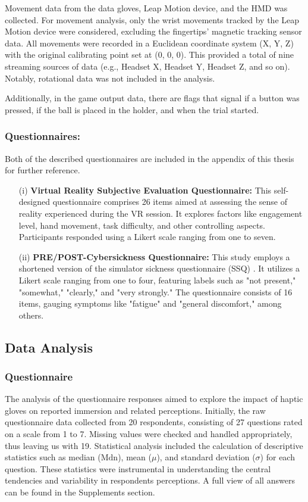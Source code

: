 \documentclass[12pt,oneside,openright]{report}
\begin{document}
 Movement data from the data gloves, Leap Motion device, and the HMD was collected. For movement analysis, only the wrist movements tracked by the Leap Motion device were considered, excluding the fingertips' magnetic tracking sensor data. All movements were recorded in a Euclidean coordinate system (X, Y, Z) with the original calibrating point set at (0, 0, 0). This provided a total of nine streaming sources of data (e.g., Headset X, Headset Y, Headset Z, and so on). Notably, rotational data was not included in the analysis.

Additionally, in the game output data, there are flags that signal if a button was pressed, if the ball is placed in the holder, and when the trial started.

\subsubsection*{Questionnaires:}
Both of the described questionnaires are included in the appendix of this thesis for further reference.

\begin{enumerate}
\item[(i)] \textbf{Virtual Reality Subjective Evaluation Questionnaire:} This self-designed questionnaire comprises 26 items aimed at assessing the sense of reality experienced during the VR session. It explores factors like engagement level, hand movement, task difficulty, and other controlling aspects. Participants responded using a Likert scale ranging from one to seven.

\item[(ii)] \textbf{PRE/POST-Cybersickness Questionnaire:} This study employs a shortened version of the simulator sickness questionnaire (SSQ) \parencite*{avpsy}. It utilizes a Likert scale ranging from one to four, featuring labels such as "not present," "somewhat," "clearly," and "very strongly." The questionnaire consists of 16 items, gauging symptoms like "fatigue" and "general discomfort," among others.
\end{enumerate}


\subsection*{Data Analysis}

\subsubsection*{Questionnaire}
The analysis of the questionnaire responses aimed to explore the impact of haptic gloves on reported immersion and related perceptions. Initially, the raw questionnaire data collected from 20 respondents, consisting of 27 questions rated on a scale from 1 to 7. Missing values were checked and handled appropriately, thus leaving us with 19. Statistical analysis included the calculation of descriptive statistics such as median ($\text{Mdn}$), mean ($\mu$), and standard deviation ($\sigma$) for each question. These statistics were instrumental in understanding the central tendencies and variability in respondents perceptions. A full view of all answers can be found in the Supplements section. 
\end{document}
